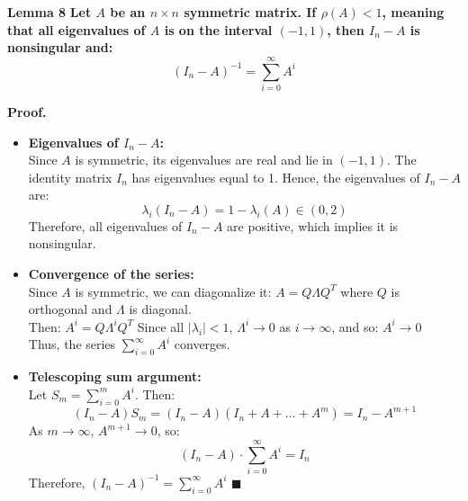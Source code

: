 \documentclass[aspectratio=169]{beamer}
\begin{document}
\begin{frame}{\textbf{Lemma 8}}
\textbf{ Let \( A \) be an \( n \times n \) symmetric matrix. If \( \rho(A) < 1 \), meaning that all eigenvalues of \( A \) is on the interval \( (-1, 1) \), then \( I_n - A \) is nonsingular and:
\[ (I_n - A)^{-1} = \sum_{i=0}^\infty A^i \]}

\textbf{Proof.}

\begin{itemize}

    \item \textbf{Eigenvalues of \( I_n - A \):} \\
    Since \( A \) is symmetric, its eigenvalues are real and lie in \( (-1, 1) \). The identity matrix \( I_n \) has eigenvalues equal to 1. Hence, the eigenvalues of \( I_n - A \) are:
    \[
    \lambda_i(I_n - A) = 1 - \lambda_i(A) \in (0, 2)
    \]
    Therefore, all eigenvalues of \( I_n - A \) are positive, which implies it is nonsingular. 
\end{itemize}
\end{frame}
\begin{frame}
    

\begin{itemize}
   
    \item \textbf{Convergence of the series:} \\
    Since \( A \) is symmetric, we can diagonalize it:
    \(
    A = Q \Lambda Q^T
    \)
    where \( Q \) is orthogonal and \( \Lambda \) is diagonal.
    \\
    Then:
    \(
    A^i = Q \Lambda^i Q^T
    \)
    Since all \( |\lambda_i| < 1 \), \( \Lambda^i \to 0 \) as \( i \to \infty \), and so:
    \( A^i \to 0 \)
    \\
    Thus, the series \( \sum_{i=0}^\infty A^i \) converges.

    \item \textbf{Telescoping sum argument:} \\
    Let \( S_m = \sum_{i=0}^m A^i \). Then:
    \[
    (I_n - A) S_m = (I_n - A)(I_n + A + \dots + A^m) = I_n - A^{m+1}
    \]
    As \( m \to \infty \), \( A^{m+1} \to 0 \), so:
    \[
    (I_n - A) \cdot \sum_{i=0}^\infty A^i = I_n
    \]
    Therefore,
    \(
    (I_n - A)^{-1} = \sum_{i=0}^\infty A^i
    \)
\hfill \(\blacksquare\)
\end{itemize}
\end{frame}

\end{document}

